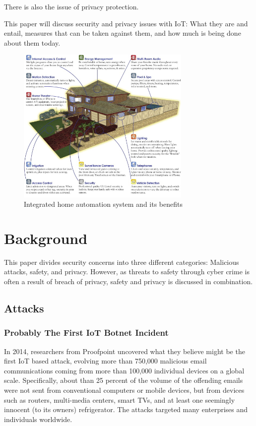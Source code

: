 \documentclass[a4paper, conference]{IEEEtran/IEEEtran}
\begin{document}
There is also the issue of privacy protection.

This paper will discuss security and privacy issues with IoT\@: What they are and entail, measures that can be taken against them, and how much is being done about them today.

\begin{figure}[!t]
\centering
\includegraphics[width=3.3in]{assets/raspberry.jpg}
\caption{Integrated home automation system and its benefits}
\label{fig:raspberry}
\end{figure}

\section{Background}
This paper divides security concerns into three different categories: Malicious attacks, safety, and privacy. However, as threats to safety through cyber crime is often a result of breach of privacy, safety and privacy is discussed in combination. 

\subsection{Attacks}
\label{sec:attacks}
\subsubsection{Probably The First IoT Botnet Incident}
In 2014, researchers from Proofpoint uncovered what they believe might be the first IoT based attack, evolving more than 750,000 malicious email communications coming from more than 100,000 individual devices on a global scale.\cite{proofpoint} Specifically, about than 25 percent of the volume of the offending emails were not sent from conventional computers or mobile devices, but from devices such as routers, multi-media centers, smart TVs, and at least one seemingly innocent (to its owners) refrigerator. The attacks targeted many enterprises and individuals worldwide.
\end{document}
